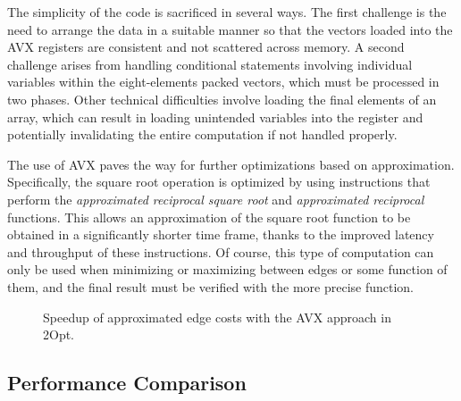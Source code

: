 The simplicity of the code is sacrificed in several ways.
The first challenge is the need to arrange the data in a suitable manner so that the vectors loaded into the AVX registers are consistent and not scattered across memory.
A second challenge arises from handling conditional statements involving individual variables within the eight-elements packed vectors, which must be processed in two phases.
Other technical difficulties involve loading the final elements of an array, which can result in loading unintended variables into the register and potentially invalidating the entire computation if not handled properly.

The use of AVX paves the way for further optimizations based on approximation.
Specifically, the square root operation is optimized by using instructions that perform the \textit{approximated reciprocal square root} and \textit{approximated reciprocal} functions.
This allows an approximation of the square root function to be obtained in a significantly shorter time frame, thanks to the improved latency and throughput of these instructions.
Of course, this type of computation can only be used when minimizing or maximizing between edges or some function of them, and the final result must be verified with the more precise function.

\begin{figure}[htbp]
    \centering
    \caption{Speedup of approximated edge costs with the AVX approach in 2Opt.} \label{fig:avxApprox}
\end{figure}

\subsection{Performance Comparison}

